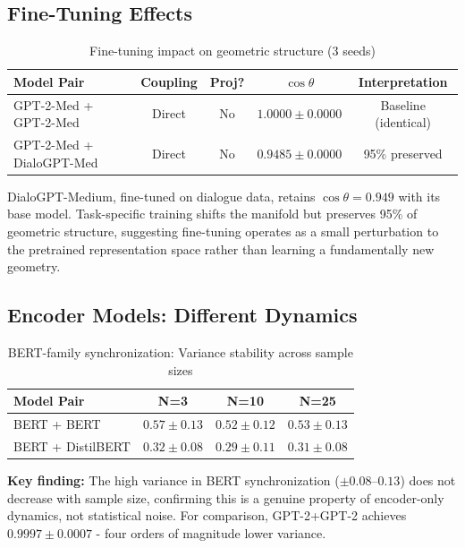 \documentclass[10pt]{article} %
\theoremstyle{plain}
\theoremstyle{definition}
\theoremstyle{remark}
\begin{document}
\subsection{Fine-Tuning Effects}

\begin{table}[htbp]
\centering
\caption{Fine-tuning impact on geometric structure (3 seeds)}
\label{tab:finetuning}
\small
\begin{tabular}{lcccc}
\toprule
\textbf{Model Pair} & \textbf{Coupling} & \textbf{Proj?} & \textbf{$\cos \theta$} & \textbf{Interpretation} \\
\midrule
GPT-2-Med + GPT-2-Med & Direct & No & $1.0000 \pm 0.0000$ & Baseline (identical) \\
GPT-2-Med + DialoGPT-Med & Direct & No & $\mathbf{0.9485 \pm 0.0000}$ & 95\% preserved \\
\bottomrule
\end{tabular}
\end{table}

DialoGPT-Medium, fine-tuned on dialogue data, retains $\cos \theta = 0.949$ with its base model. Task-specific training shifts the manifold but preserves 95\% of geometric structure, suggesting fine-tuning operates as a small perturbation to the pretrained representation space rather than learning a fundamentally new geometry.

\subsection{Encoder Models: Different Dynamics}

\begin{table}[htbp]
\centering
\caption{BERT-family synchronization: Variance stability across sample sizes}
\label{tab:bert}
\small
\begin{tabular}{lccc}
\toprule
\textbf{Model Pair} & \textbf{N=3} & \textbf{N=10} & \textbf{N=25} \\
\midrule
BERT + BERT & $0.57 \pm 0.13$ & $0.52 \pm 0.12$ & $0.53 \pm 0.13$ \\
BERT + DistilBERT & $0.32 \pm 0.08$ & $0.29 \pm 0.11$ & $0.31 \pm 0.08$ \\
\bottomrule
\end{tabular}
\end{table}

\textbf{Key finding:} The high variance in BERT synchronization ($\pm 0.08$--$0.13$) does not decrease with sample size, confirming this is a genuine property of encoder-only dynamics, not statistical noise. For comparison, GPT-2+GPT-2 achieves $0.9997 \pm 0.0007$ - four orders of magnitude lower variance.
\end{document}

